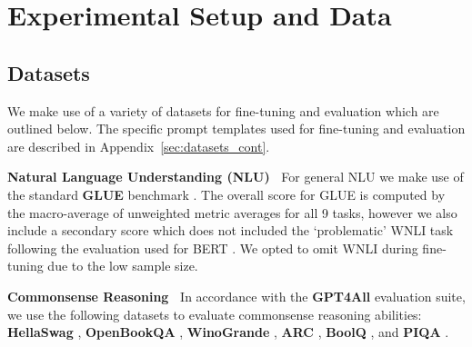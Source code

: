 \section{Experimental Setup and Data} \label{sec:methodology}

\subsection{Datasets}
We make use of a variety of datasets for fine-tuning and evaluation which are outlined below. The specific prompt templates used for fine-tuning and evaluation are described in Appendix~\ref{sec:datasets_cont}.

\textbf{Natural Language Understanding (NLU)\ }
For general NLU we make use of the standard \textbf{GLUE} benchmark \cite{wang2019glue}. The overall score for GLUE is computed by the macro-average of unweighted metric averages for all 9 tasks, however we also include a secondary score which does not included the `problematic' WNLI task following the evaluation used for BERT \cite{devlin2019bert}. We opted to omit WNLI during fine-tuning due to the low sample size. %

\textbf{Commonsense Reasoning\ }
In accordance with the \textbf{GPT4All} \cite{gpt4all} evaluation suite, we use the following datasets to evaluate commonsense reasoning abilities:
\textbf{HellaSwag} \cite{zellers2019hellaswag},
\textbf{OpenBookQA} \cite{mihaylov2018suit},
\textbf{WinoGrande} \cite{DBLP:journals/corr/abs-1907-10641},
\textbf{ARC} \cite{clark2018think},
\textbf{BoolQ} \cite{clark2019boolq},
and \textbf{PIQA} \cite{bisk2019piqa}.


